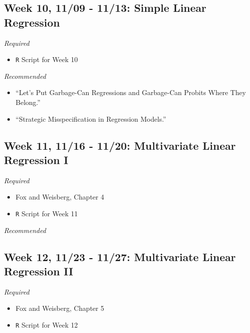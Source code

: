 \documentclass[11pt,]{article}
\providecommand{\tightlist}{%
  \setlength{\itemsep}{0pt}\setlength{\parskip}{0pt}}
\begin{document}
\hypertarget{week-10-1109---1113-simple-linear-regression}{%
\subsection{Week 10, 11/09 - 11/13: Simple Linear
Regression}\label{week-10-1109---1113-simple-linear-regression}}

\emph{Required}

\begin{itemize}
\tightlist
\item
  \texttt{R} Script for Week 10
\end{itemize}

\emph{Recommended}

\begin{itemize}
\item
  ``Let's Put Garbage-Can Regressions and Garbage-Can Probits Where They
  Belong.''
\item
  ``Strategic Misspecification in Regression Models.''
\end{itemize}

\hypertarget{week-11-1116---1120-multivariate-linear-regression-i}{%
\subsection{Week 11, 11/16 - 11/20: Multivariate Linear Regression
I}\label{week-11-1116---1120-multivariate-linear-regression-i}}

\emph{Required}

\begin{itemize}
\item
  Fox and Weisberg, Chapter 4
\item
  \texttt{R} Script for Week 11
\end{itemize}

\emph{Recommended}

\hypertarget{week-12-1123---1127-multivariate-linear-regression-ii}{%
\subsection{Week 12, 11/23 - 11/27: Multivariate Linear Regression
II}\label{week-12-1123---1127-multivariate-linear-regression-ii}}

\emph{Required}

\begin{itemize}
\item
  Fox and Weisberg, Chapter 5
\item
  \texttt{R} Script for Week 12
\end{itemize}
\end{document}
